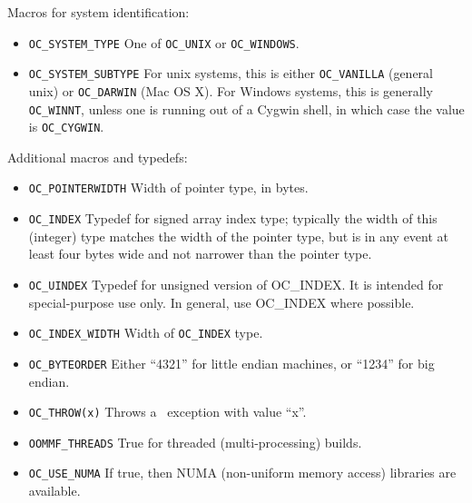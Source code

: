 Macros for system identification:
\begin{itemize}
\item{\texttt{OC\_SYSTEM\_TYPE}} \gbs One of \texttt{OC\_UNIX} or
  \texttt{OC\_WINDOWS}.
\item{\texttt{OC\_SYSTEM\_SUBTYPE}} \gbs For unix systems, this is
    either \texttt{OC\_VANILLA} (general unix) or \texttt{OC\_DARWIN}
    (Mac OS X).  For Windows systems, this is generally
    \texttt{OC\_WINNT}, unless one is running out of a Cygwin shell,
    in which case the value is \texttt{OC\_CYGWIN}.
\end{itemize}

Additional macros and typedefs:
\begin{itemize}
\item{\texttt{OC\_POINTERWIDTH}} \gbs Width of pointer type, in bytes.
\item{\texttt{OC\_INDEX}} \gbs Typedef for signed array index type;
  typically the width of this (integer) type matches the width of the
  pointer type, but is in any event at least four bytes wide and not
  narrower than the pointer type.
\item{\texttt{OC\_UINDEX}} \gbs Typedef for unsigned version of
  OC\_INDEX.  It is intended for special-purpose use only.  In general,
  use OC\_INDEX where possible.
\item{\texttt{OC\_INDEX\_WIDTH}} \gbs Width of \texttt{OC\_INDEX} type.
\item{\texttt{OC\_BYTEORDER}} Either ``4321'' for little endian machines,
  or ``1234'' for big endian.
\item{\texttt{OC\_THROW(x)}} \gbs Throws a \Cplusplus\ exception with
  value ``x''.
\item{\texttt{OOMMF\_THREADS}} \gbs True for threaded (multi-processing) builds.
\item{\texttt{OC\_USE\_NUMA}} \gbs If true, then NUMA (non-uniform memory
  access) libraries are available.
\end{itemize}
